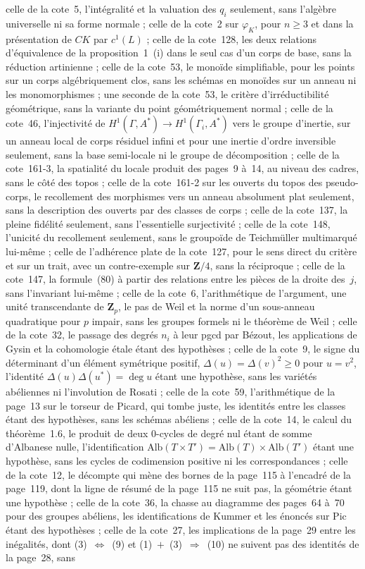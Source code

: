 \documentclass[11pt]{article}
\theoremstyle{plain}
\theoremstyle{definition}
\theoremstyle{plain}
\theoremstyle{definition}
\theoremstyle{remark}
\renewcommand{\_}{\bkunderscore\allowbreak}
\begin{document}
celle de la cote~5, l'intégralité et la valuation des $q_i$ seulement, sans l'algèbre universelle ni sa forme normale ; celle de la cote~2 sur $\varphi_K$, pour $n \geq 3$ et dans la présentation de $CK$ par $c^1(L)$ ; celle de la cote~128, les deux relations d'équivalence de la proposition~1~(i) dans le seul cas d'un corps de base, sans la réduction artinienne ; celle de la cote~53, le monoïde simplifiable, pour les points sur un corps algébriquement clos, sans les schémas en monoïdes sur un anneau ni les monomorphismes ; une seconde de la cote~53, le critère d'irréductibilité géométrique, sans la variante du point géométriquement normal ; celle de la cote~46, l'injectivité de $H^1(\Gamma, A^*) \to H^1(\Gamma_i, A^*)$ vers le groupe d'inertie, sur un anneau local de corps résiduel infini et pour une inertie d'ordre inversible seulement, sans la base semi-locale ni le groupe de décomposition ; celle de la cote~161-3, la spatialité du locale produit des pages~9 à~14, au niveau des cadres, sans le côté des topos ; celle de la cote~161-2 sur les ouverts du topos des pseudo-corps, le recollement des morphismes vers un anneau absolument plat seulement, sans la description des ouverts par des classes de corps ; celle de la cote~137, la pleine fidélité seulement, sans l'essentielle surjectivité ; celle de la cote~148, l'unicité du recollement seulement, sans le groupoïde de Teichmüller multimarqué lui-même ; celle de l'adhérence plate de la cote~127, pour le sens direct du critère et sur un trait, avec un contre-exemple sur $\mathbf Z/4$, sans la réciproque ; celle de la cote~147, la formule~(80) à partir des relations entre les pièces de la droite des~$j$, sans l'invariant lui-même ; celle de la cote~6, l'arithmétique de l'argument, une unité transcendante de $\mathbf Z_p$, le pas de Weil et la norme d'un sous-anneau quadratique pour $p$ impair, sans les groupes formels ni le théorème de Weil ; celle de la cote~32, le passage des degrés $n_i$ à leur pgcd par Bézout, les applications de Gysin et la cohomologie étale étant des hypothèses ; celle de la cote~9, le signe du déterminant d'un élément symétrique positif, $\Delta(u) = \Delta(v)^2 \geq 0$ pour $u = v^2$, l'identité $\Delta(u)\Delta(u^*) = \deg u$ étant une hypothèse, sans les variétés abéliennes ni l'involution de Rosati ; celle de la cote~59, l'arithmétique de la page~13 sur le torseur de Picard, qui tombe juste, les identités entre les classes étant des hypothèses, sans les schémas abéliens ; celle de la cote~14, le calcul du théorème~1.6, le produit de deux $0$-cycles de degré nul étant de somme d'Albanese nulle, l'identification $\mathrm{Alb}(T \times T') = \mathrm{Alb}(T) \times \mathrm{Alb}(T')$ étant une hypothèse, sans les cycles de codimension positive ni les correspondances ; celle de la cote~12, le décompte qui mène des bornes de la page~115 à l'encadré de la page~119, dont la ligne de résumé de la page~115 ne suit pas, la géométrie étant une hypothèse ; celle de la cote~36, la chasse au diagramme des pages~64 à~70 pour des groupes abéliens, les identifications de Kummer et les énoncés sur $\mathrm{Pic}$ étant des hypothèses ; celle de la cote~27, les implications de la page~29 entre les inégalités, dont (3)~$\Leftrightarrow$~(9) et (1)~$+$~(3)~$\Rightarrow$~(10) ne suivent pas des identités de la page~28, sans 
\end{document}
